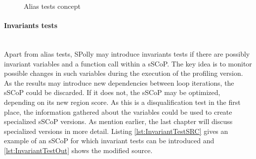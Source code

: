 \lstset{frame=none}
\begin{figure}[htbp]
  \centering

  \vspace*{5mm}
  
  \caption{Alias tests concept}
  \label{fig:Aliastest}  
\end{figure}
\resetlst

\paragraph{Invariants tests \\}
~\\
Apart from alias tests, SPolly may introduce invariants tests if there are
possibly invariant variables and a function call within a sSCoP. The key idea
is to monitor possible changes in such variables during the execution of the 
profiling version. As the results may introduce new dependencies 
between loop iterations, the sSCoP could be discarded. If it does not, the sSCoP
may be optimized, depending on its new region score. As this is a 
disqualification test in the first place, the information gathered about the 
variables could be used to create specialized sSCoP versions. 
As mention earlier, the last chapter will discuss specialized versions 
in more detail. Listing \ref{lst:InvariantTestSRC} gives an example of an sSCoP 
for which invariant tests can be introduced and \ref{lst:InvariantTestOut} shows
the modified source. 


